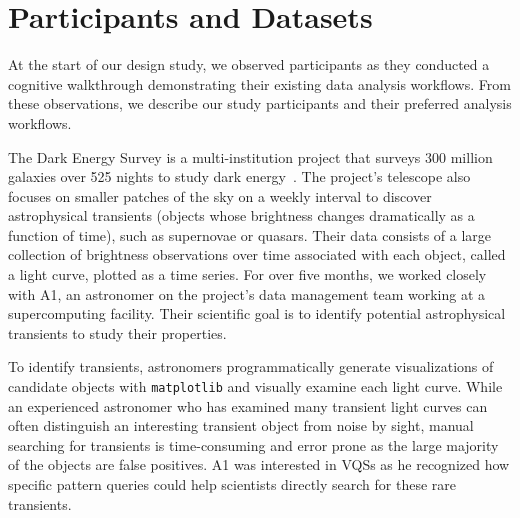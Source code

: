 \section{Participants and Datasets\label{sec:participantdatasets}}
At the start of our design study, we observed participants as they conducted a cognitive walkthrough demonstrating their existing data analysis workflows. From these observations, we describe our study participants and their preferred analysis workflows.%
\par\noindent{} The Dark Energy Survey is a multi-institution project that surveys 300 million galaxies over 525 nights to study dark energy~\cite{Drlica-Wagner2017}. The project's telescope also focuses on smaller patches of the sky on a weekly interval to discover astrophysical transients (objects whose brightness changes dramatically as a function of time), such as supernovae or quasars. Their data consists of a large collection of brightness observations over time associated with each object, called a light curve, plotted as a time series. For over five months, we worked closely with A1, an astronomer on the project's data management team working at a supercomputing facility. Their scientific goal is to identify potential astrophysical transients to study their properties. 
\par To identify transients, astronomers programmatically generate visualizations of candidate objects with \texttt{matplotlib} and visually examine each light curve. While an experienced astronomer who has examined many transient light curves can often distinguish an interesting transient object from noise by sight, manual searching for transients is time-consuming and error prone as the large majority of the objects are false positives. A1 was interested in VQSs as he recognized how specific pattern queries could help scientists directly search for these rare transients.
